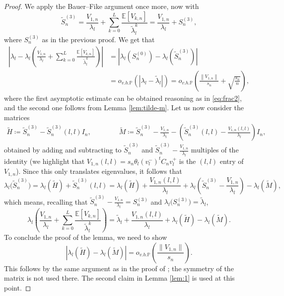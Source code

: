 \documentclass[11pt,oneside]{amsart}
\theoremstyle{plain}
\numberwithin{equation}{section}
\newcommand{\E}{\mathbb{E}}
\newcommand{\p}{\mathbb{P}}
\newcommand{\centered}{C_n}
\newcommand{\deterministic}{S_n}
\newcommand{\tildedeterministic}{\widetilde{S}_n}
\newcommand{\scaling}{s_n}
\newcommand{\ohp}{o_{v.h.\p}}
\begin{document}
\begin{proof}
We apply the Bauer--Fike argument once more, now with  $$\tildedeterministic^{(3)}=\frac{V_{1,n}}{\lambda_l} +\sum_{k=0}^L\frac{\E[V_{k,n}]}{\tilde \lambda_l^k} =\frac{V_{1,n}}{\lambda_l}+\deterministic^{(3)},$$ where $\deterministic^{(3)}$ as in the previous proof. We get that
\begin{equation}
\begin{split}
    \left|\lambda_l-\lambda_l\left(\frac{V_{1,n}}{\lambda_l} +\sum_{k=0}^L\frac{\E[V_{k,n}]}{\tilde \lambda_l^k} \right)\right|
    &=\left|\lambda_l(\deterministic^{(0)})-\lambda_l(\tildedeterministic^{(3)})\right| 
    \\&= \ohp(|\lambda_l-\tilde\lambda_l|)
    =\ohp \left(\frac{\left\|V_{1,n}\right\|}{\scaling}+\sqrt{\frac{\scaling}{n}}\right),
    \end{split}
\end{equation}
where the first asymptotic estimate can be obtained reasoning as in \eqref{eq:frac2}, and the second one follows from Lemma \ref{lem:tilde-m}.
Let us now consider the matrices
\begin{align*}
    \tilde{H}\coloneqq \tildedeterministic^{(3)} - \tildedeterministic^{(3)}(l,l)I_n ,\qquad \qquad
    \tilde{M}\coloneqq \tildedeterministic^{(3)}-\frac{V_{1,n}}{\lambda_l} - \left(\tildedeterministic^{(3)}(l,l)-\frac{V_{1,n}(l,l)}{\lambda_l}\right)I_n,%
\end{align*}
obtained by adding and subtracting to $\tildedeterministic^{(3)}$ and $\tildedeterministic^{(3)}-\frac{V_{1,n}}{\lambda_l}$ multiples of the identity (we highlight that $V_{1,n}(l,l)=\scaling \theta_l (v_l^-)^t \centered v_l^+$ is the $(l,l)$ entry of $V_{1,n}$). Since this only translates eigenvalues, it follows that
\begin{equation}
    \lambda_l\big(\tildedeterministic^{(3)} \big)
    = \lambda_l(\tilde{H})+\tildedeterministic^{(3)}(l,l)
    =\lambda_l(\tilde{H})+\frac{V_{1,n}(l,l)}{\lambda_l}+\lambda_l\left(\tildedeterministic^{(3)}-\frac{V_{1,n}}{\lambda_l}\right)-\lambda_l(\tilde{M}),
\end{equation}
which means, recalling that $\tildedeterministic^{(3)}-\frac{V_{1,n}}{\lambda_l}=\deterministic^{(3)}$ and $\lambda_l\big(\deterministic^{(3)}\big)=\tilde\lambda_l$,
\begin{equation}
    \lambda_l\left(\frac{V_{1,n}}{\lambda_l} +\sum_{k=0}^L\frac{\E[V_{k,n}]}{\tilde \lambda_l^k}\right)=\tilde\lambda_l+\frac{V_{1,n}(l,l)}{\lambda_l}+\lambda_l(\tilde{H})-\lambda_l(\tilde{M}).
\end{equation}
To conclude the proof of the lemma, we need to show
$$|\lambda_l(\tilde{H})-\lambda_l(\tilde{M})|= \ohp\left(\frac{\|V_{1,n}\|}{\scaling}\right).$$
This follows by the same argument as in the proof of \cite[Lemma 5.8, after Eq.\ (5.26)]{CCH};  the symmetry of the matrix is not used there. The second claim in Lemma \ref{lem:1} is used at this point.
\end{proof}
\end{document}
